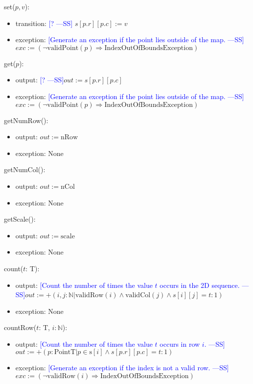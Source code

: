 \documentclass[12pt]{article}
\newcommand{\authornote}[3]{\textcolor{#1}{[#3 ---#2]}}
\newcommand{\authornote}[3]{}
\newcommand{\wss}[1]{\authornote{blue}{SS}{#1}}
\begin{document}
\noindent set($p, v$):
\begin{itemize}
\item transition: \wss{?} $s[p.r][p.c] := v$
\item exception: \wss{Generate an exception if the point lies outside of the
    map.} $exc := (\neg \mbox{validPoint}(p) \Rightarrow \mbox{IndexOutOfBoundsException})$
\end{itemize}

\noindent get($p$):
\begin{itemize}
\item output: \wss{?}$out := s[p.r][p.c]$
\item exception: \wss{Generate an exception if the point lies outside of the
    map.}$exc := (\neg \mbox{validPoint}(p) \Rightarrow \mbox{IndexOutOfBoundsException})$
\end{itemize}

\noindent getNumRow():
\begin{itemize}
\item output: $out := \mbox{nRow}$
\item exception: None
\end{itemize}

\noindent getNumCol():
\begin{itemize}
\item output: $out := \mbox{nCol}$
\item exception: None
\end{itemize}

\noindent getScale():
\begin{itemize}
\item output: $out := \mbox{scale}$
\item exception: None
\end{itemize}

\noindent count($t$: T):
\begin{itemize}
\item output: \wss{Count the number of times the value $t$ occurs in the 2D
    sequence.}$out := +(i, j: \mathbb{N}| \mbox{validRow}(i) \land
  \mbox{validCol}(j) \wedge s[i][j] = t : 1)$
\item exception: None
\end{itemize}

\noindent countRow($t$: T, $i: \mathbb{N}$):
\begin{itemize}
\item output: \wss{Count the number of times the value $t$ occurs in row
    $i$.} $out := +(p: \mbox{PointT} | p \in \mbox{s}[i] \wedge
  s[p.r][p.c] = t : 1)$
\item exception: \wss{Generate an exception if the index is not a valid
    row.} $exc := (\neg\mbox{validRow}(i) \Rightarrow \mbox{IndexOutOfBoundsException})$
\end{itemize}
\end{document}
